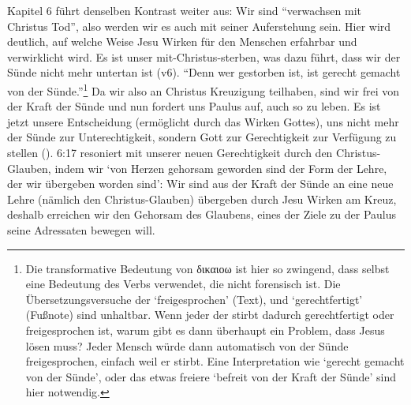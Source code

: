 Kapitel 6 führt denselben Kontrast weiter aus: Wir sind ``verwachsen mit Christus Tod'', also werden wir es auch mit seiner Auferstehung sein.
Hier wird deutlich, auf welche Weise Jesu Wirken für den Menschen erfahrbar und verwirklicht wird.
Es ist unser mit-Christus-sterben, was dazu führt, dass wir der Sünde nicht mehr untertan ist (v6).
``Denn wer gestorben ist, ist gerecht gemacht von der Sünde.''\footnote{
	Die transformative Bedeutung von δικαιοω ist hier so zwingend, dass selbst \Cite{nicnt-romans}
	eine Bedeutung des Verbs verwendet, die nicht forensisch ist.
	Die Übersetzungsversuche der \Cite{elb} `freigesprochen' (Text), und `gerechtfertigt' (Fußnote) sind unhaltbar.
	Wenn jeder der stirbt dadurch gerechtfertigt oder freigesprochen ist, warum gibt es dann überhaupt ein Problem, dass Jesus lösen muss?
	Jeder Mensch würde dann automatisch von der Sünde freigesprochen, einfach weil er stirbt.
	Eine Interpretation wie `gerecht gemacht von der Sünde', oder das etwas freiere `befreit von der Kraft der Sünde' sind hier notwendig.
}
Da wir also an Christus Kreuzigung teilhaben, sind wir frei von der Kraft der Sünde und nun fordert uns Paulus auf, auch so zu leben.
Es ist jetzt unsere Entscheidung (ermöglicht durch das Wirken Gottes), uns nicht mehr der Sünde zur Unterechtigkeit, sondern Gott zur Gerechtigkeit
zur Verfügung zu stellen ().
6:17 resoniert mit unserer neuen Gerechtigkeit durch den Christus-Glauben, indem wir `von Herzen gehorsam geworden sind der Form der Lehre, der wir übergeben worden sind':
Wir sind aus der Kraft der Sünde an eine neue Lehre (nämlich den Christus-Glauben) übergeben durch Jesu Wirken am Kreuz,
deshalb erreichen wir den Gehorsam des Glaubens, eines der Ziele zu der Paulus seine Adressaten bewegen will.

